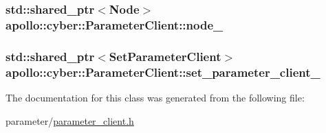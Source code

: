 \hypertarget{classapollo_1_1cyber_1_1ParameterClient_af5b1cc3adbe4ac895b0a208156a233b9}{
\subsubsection[{node\-\_\-}]{\setlength{\rightskip}{0pt plus 5cm}std\-::shared\-\_\-ptr$<${\bf Node}$>$ apollo\-::cyber\-::\-Parameter\-Client\-::node\-\_\-\hspace{0.3cm}{\ttfamily [private]}}}\label{classapollo_1_1cyber_1_1ParameterClient_af5b1cc3adbe4ac895b0a208156a233b9}
\hypertarget{classapollo_1_1cyber_1_1ParameterClient_a7c2d404d40870ee96fe51ca736ca8dd0}{
\subsubsection[{set\-\_\-parameter\-\_\-client\-\_\-}]{\setlength{\rightskip}{0pt plus 5cm}std\-::shared\-\_\-ptr$<${\bf Set\-Parameter\-Client}$>$ apollo\-::cyber\-::\-Parameter\-Client\-::set\-\_\-parameter\-\_\-client\-\_\-\hspace{0.3cm}{\ttfamily [private]}}}\label{classapollo_1_1cyber_1_1ParameterClient_a7c2d404d40870ee96fe51ca736ca8dd0}


The documentation for this class was generated from the following file\-:\begin{DoxyCompactItemize}
\item 
parameter/\hyperlink{parameter__client_8h}{parameter\-\_\-client.\-h}\end{DoxyCompactItemize}
